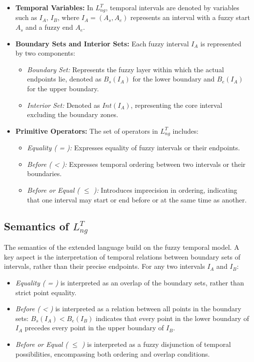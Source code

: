 \begin{itemize}
    \item \textbf{Temporal Variables:} In \( L_{ng}^T \), temporal intervals are denoted by variables such as \( I_A \), \( I_B \), where \( I_A = (A_s, A_e) \) represents an interval with a fuzzy start \( A_s \) and a fuzzy end \( A_e \).
    
    \item \textbf{Boundary Sets and Interior Sets:} Each fuzzy interval \( I_A \) is represented by two components:
    \begin{itemize}
        \item \textit{Boundary Set:} Represents the fuzzy layer within which the actual endpoints lie, denoted as \( B_s(I_A) \) for the lower boundary and \( B_e(I_A) \) for the upper boundary.
        \item \textit{Interior Set:} Denoted as \( Int(I_A) \), representing the core interval excluding the boundary zones.
    \end{itemize}
    
    \item \textbf{Primitive Operators:} The set of operators in \( L_{ng}^T \) includes:
    \begin{itemize}
        \item \textit{Equality ( = ):} Expresses equality of fuzzy intervals or their endpoints.
        \item \textit{Before ( < ):} Expresses temporal ordering between two intervals or their boundaries.
        \item \textit{Before or Equal ( \( \leq \) ):} Introduces imprecision in ordering, indicating that one interval may start or end before or at the same time as another.
    \end{itemize}
\end{itemize}

\subsection{Semantics of \( L_{ng}^T \)}\label{V-subsec:lngtsemantics}

The semantics of the extended language build on the fuzzy temporal model. A key aspect is the interpretation of temporal relations between boundary sets of intervals, rather than their precise endpoints. For any two intervals \( I_A \) and \( I_B \):

\begin{itemize}
    \item \textit{Equality ( = )} is interpreted as an overlap of the boundary sets, rather than strict point equality.
    \item \textit{Before ( < )} is interpreted as a relation between all points in the boundary sets: \( B_s(I_A) < B_e(I_B) \) indicates that every point in the lower boundary of \( I_A \) precedes every point in the upper boundary of \( I_B \).
    \item \textit{Before or Equal ( \( \leq \) )} is interpreted as a fuzzy disjunction of temporal possibilities, encompassing both ordering and overlap conditions.
\end{itemize}

